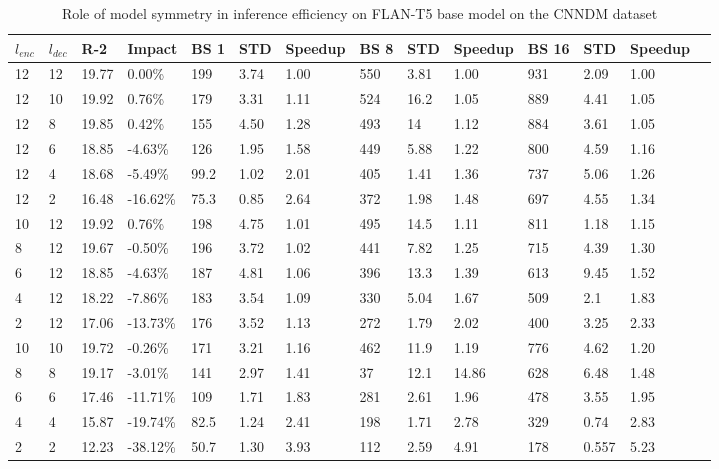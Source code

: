 \begin{table*}[!ht]
    \centering
    \caption{Role of model symmetry in inference efficiency on FLAN-T5 base model on the CNNDM dataset}
    \small
    \begin{tabular}{|l|l|l|l|l|l|l|l|l|l|l|l|l|l|}
    \hline
         $l_{enc}$ & $l_{dec}$ & R-2 & Impact & BS 1 & STD & Speedup & BS 8 & STD  & Speedup & BS 16 & STD & Speedup \\ \hline
         12 & 12 & 19.77 & 0.00\% & 199 & 3.74 & 1.00 & 550 & 3.81 & 1.00 & 931 & 2.09 & 1.00 \\ \hline
        12 & 10 & 19.92 & 0.76\% & 179 & 3.31 & 1.11 & 524 & 16.2 & 1.05 & 889 & 4.41 & 1.05 \\ \hline
        12 & 8 & 19.85 & 0.42\% & 155 & 4.50 & 1.28 & 493 & 14 & 1.12 & 884 & 3.61 & 1.05 \\ \hline
        12 & 6 & 18.85 & -4.63\% & 126 & 1.95 & 1.58 & 449 & 5.88 & 1.22 & 800 & 4.59 & 1.16 \\ \hline
        12 & 4 & 18.68 & -5.49\% & 99.2 & 1.02 & 2.01 & 405 & 1.41 & 1.36 & 737 & 5.06 & 1.26 \\ \hline
        12 & 2 & 16.48 & -16.62\% & 75.3 & 0.85 & 2.64 & 372 & 1.98 & 1.48 & 697 & 4.55 & 1.34 \\ \hline
        10 & 12 & 19.92 & 0.76\% & 198 & 4.75 & 1.01 & 495 & 14.5 & 1.11 & 811 & 1.18 & 1.15 \\ \hline
        8 & 12 & 19.67 & -0.50\% & 196 & 3.72 & 1.02 & 441 & 7.82 & 1.25 & 715 & 4.39 & 1.30 \\ \hline
        6 & 12 & 18.85 & -4.63\% & 187 & 4.81 & 1.06 & 396 & 13.3 & 1.39 & 613 & 9.45 & 1.52 \\ \hline
        4 & 12 & 18.22 & -7.86\% & 183 & 3.54 & 1.09 & 330 & 5.04 & 1.67 & 509 & 2.1 & 1.83 \\ \hline
        2 & 12 & 17.06 & -13.73\% & 176 & 3.52 & 1.13 & 272 & 1.79 & 2.02 & 400 & 3.25 & 2.33 \\ \hline
        10 & 10 & 19.72 & -0.26\% & 171 & 3.21 & 1.16 & 462 & 11.9 & 1.19 & 776 & 4.62 & 1.20 \\ \hline
        8 & 8 & 19.17 & -3.01\% & 141 & 2.97 & 1.41 & 37 & 12.1 & 14.86 & 628 & 6.48 & 1.48 \\ \hline
        6 & 6 & 17.46 & -11.71\% & 109 & 1.71 & 1.83 & 281 & 2.61 & 1.96 & 478 & 3.55 & 1.95 \\ \hline
        4 & 4 & 15.87 & -19.74\% & 82.5 & 1.24 & 2.41 & 198 & 1.71 & 2.78 & 329 & 0.74 & 2.83 \\ \hline
        2 & 2 & 12.23 & -38.12\% & 50.7 & 1.30 & 3.93 & 112 & 2.59 & 4.91 & 178 & 0.557 & 5.23 \\ \hline
    \end{tabular}
    \label{tab:cnndm-asym-inference-base}
\end{table*}

